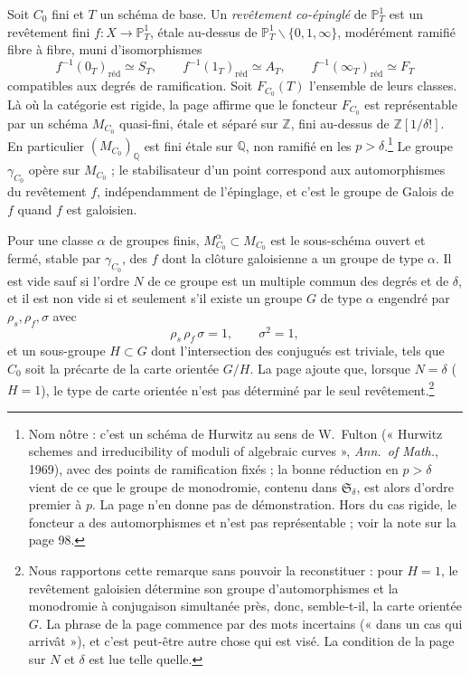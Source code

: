 \documentclass[11pt,a4paper]{article}
\begin{document}
Soit $C_{0}$ fini et $T$ un schéma de base. Un \emph{revêtement co-épinglé} de
$\mathbb{P}^{1}_{T}$ est un revêtement fini $f : X \to \mathbb{P}^{1}_{T}$, étale
au-dessus de $\mathbb{P}^{1}_{T} \smallsetminus \{0, 1, \infty\}$, modérément
ramifié fibre à fibre, muni d'isomorphismes
\[
f^{-1}(0_{T})_{\mathrm{réd}} \simeq S_{T}, \qquad
f^{-1}(1_{T})_{\mathrm{réd}} \simeq A_{T}, \qquad
f^{-1}(\infty_{T})_{\mathrm{réd}} \simeq F_{T}
\]
compatibles aux degrés de ramification. Soit $F_{C_{0}}(T)$ l'ensemble de leurs
classes. Là où la catégorie est rigide, la page affirme que le foncteur
$F_{C_{0}}$ est représentable par un schéma $M_{C_{0}}$ quasi-fini, étale et
séparé sur $\mathbb{Z}$, fini au-dessus de $\mathbb{Z}[1/\delta!]$. En particulier
$(M_{C_{0}})_{\mathbb{Q}}$ est fini étale sur $\mathbb{Q}$, non ramifié en les $p >
\delta$.\footnote{Nom nôtre : c'est un schéma de Hurwitz au sens de W.~Fulton
(« Hurwitz schemes and irreducibility of moduli of algebraic curves »,
\emph{Ann.\ of Math.}, 1969), avec des points de ramification fixés ; la bonne
réduction en $p > \delta$ vient de ce que le groupe de monodromie, contenu dans
$\mathfrak{S}_{\delta}$, est alors d'ordre premier à $p$. La page n'en donne pas
de démonstration. Hors du cas rigide, le foncteur a des automorphismes et
n'est pas représentable ; voir la note sur la page 98.} Le groupe
$\gamma_{C_{0}}$ opère sur $M_{C_{0}}$ ; le stabilisateur d'un point correspond
aux automorphismes du revêtement $f$, indépendamment de l'épinglage, et c'est
le groupe de Galois de $f$ quand $f$ est galoisien.

Pour une classe $\alpha$ de groupes finis, $M^{\alpha}_{C_{0}} \subset
M_{C_{0}}$ est le sous-schéma ouvert et fermé, stable par $\gamma_{C_{0}}$, des
$f$ dont la clôture galoisienne a un groupe de type $\alpha$. Il est vide sauf
si l'ordre $N$ de ce groupe est un multiple commun des degrés et de $\delta$, et
il est non vide si et seulement s'il existe un groupe $G$ de type $\alpha$
engendré par $\rho_{s}, \rho_{f}, \sigma$ avec
\[
\rho_{s}\, \rho_{f}\, \sigma = 1, \qquad \sigma^{2} = 1,
\]
et un sous-groupe $H \subset G$ dont l'intersection des conjugués est triviale,
tels que $C_{0}$ soit la précarte de la carte orientée $G/H$. La page ajoute
que, lorsque $N = \delta$ ($H = 1$), le type de carte orientée n'est pas
déterminé par le seul revêtement.\footnote{Nous rapportons cette remarque sans
pouvoir la reconstituer : pour $H = 1$, le revêtement galoisien détermine son
groupe d'automorphismes et la monodromie à conjugaison simultanée près, donc,
semble-t-il, la carte orientée $G$. La phrase de la page commence par des mots
incertains (« dans un cas qui arrivât »), et c'est peut-être autre chose qui
est visé. La condition de la page sur $N$ et $\delta$ est lue telle quelle.}
\end{document}
